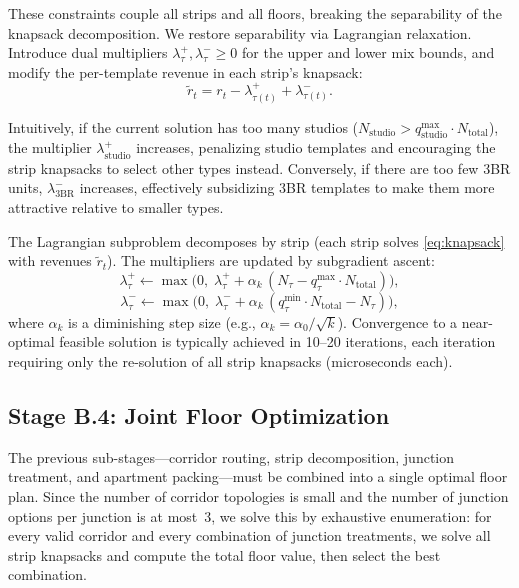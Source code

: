 \documentclass[11pt,a4paper]{article}
\begin{document}
These constraints couple all strips and all floors, breaking the
separability of the knapsack decomposition. We restore separability via
Lagrangian relaxation. Introduce dual multipliers
$\lambda_\tau^+, \lambda_\tau^- \geq 0$ for the upper and lower mix
bounds, and modify the per-template revenue in each strip's knapsack:
\begin{equation}\label{eq:lagrangian}
    \tilde{r}_t = r_t - \lambda_{\tau(t)}^+ + \lambda_{\tau(t)}^-.
\end{equation}

Intuitively, if the current solution has too many studios
($N_{\text{studio}} > q_{\text{studio}}^{\max} \cdot N_{\text{total}}$),
the multiplier $\lambda_{\text{studio}}^+$ increases, penalizing
studio templates and encouraging the strip knapsacks to select other
types instead. Conversely, if there are too few 3BR units,
$\lambda_{\text{3BR}}^-$ increases, effectively subsidizing 3BR
templates to make them more attractive relative to smaller types.

The Lagrangian subproblem decomposes by strip (each strip solves
\eqref{eq:knapsack} with revenues $\tilde{r}_t$). The multipliers are
updated by subgradient ascent:
\begin{equation}
    \lambda_\tau^+ \leftarrow \max\!\bigl(0,\; \lambda_\tau^+ + \alpha_k\,(N_\tau - q_\tau^{\max} \cdot N_{\text{total}})\bigr),
\end{equation}
\begin{equation}
    \lambda_\tau^- \leftarrow \max\!\bigl(0,\; \lambda_\tau^- + \alpha_k\,(q_\tau^{\min} \cdot N_{\text{total}} - N_\tau)\bigr),
\end{equation}
where $\alpha_k$ is a diminishing step size (e.g.,
$\alpha_k = \alpha_0 / \sqrt{k}$). Convergence to a near-optimal
feasible solution is typically achieved in 10--20 iterations, each
iteration requiring only the re-solution of all strip knapsacks
(microseconds each).


\subsection{Stage B.4: Joint Floor Optimization}\label{sec:joint}

The previous sub-stages---corridor routing, strip decomposition, junction
treatment, and apartment packing---must be combined into a single optimal
floor plan. Since the number of corridor topologies is small and the
number of junction options per junction is at most~3, we solve this
by exhaustive enumeration: for every valid corridor and every combination
of junction treatments, we solve all strip knapsacks and compute the
total floor value, then select the best combination.
\end{document}
